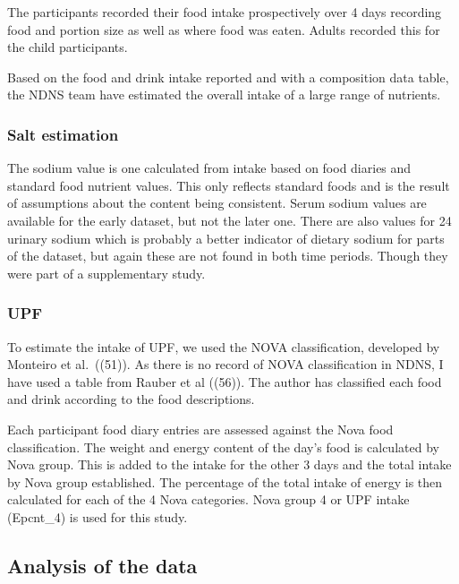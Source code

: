\documentclass[
]{article}
\begin{document}
The participants recorded their food intake prospectively over 4 days
recording food and portion size as well as where food was eaten. Adults
recorded this for the child participants.

Based on the food and drink intake reported and with a composition data
table, the NDNS team have estimated the overall intake of a large range
of nutrients.

\hypertarget{salt-estimation}{%
\subsubsection{Salt estimation}\label{salt-estimation}}

The sodium value is one calculated from intake based on food diaries and
standard food nutrient values. This only reflects standard foods and is
the result of assumptions about the content being consistent. Serum
sodium values are available for the early dataset, but not the later
one. There are also values for 24 urinary sodium which is probably a
better indicator of dietary sodium for parts of the dataset, but again
these are not found in both time periods. Though they were part of a
supplementary study.

\hypertarget{upf-1}{%
\subsubsection{UPF}\label{upf-1}}

To estimate the intake of UPF, we used the NOVA classification,
developed by Monteiro et al.~((51)). As there is no record of NOVA
classification in NDNS, I have used a table from Rauber et al ((56)).
The author has classified each food and drink according to the food
descriptions.

Each participant food diary entries are assessed against the Nova food
classification. The weight and energy content of the day's food is
calculated by Nova group. This is added to the intake for the other 3
days and the total intake by Nova group established. The percentage of
the total intake of energy is then calculated for each of the 4 Nova
categories. Nova group 4 or UPF intake (Epcnt\_4) is used for this
study.

\hypertarget{analysis-of-the-data}{%
\subsection{Analysis of the data}\label{analysis-of-the-data}}
\end{document}
